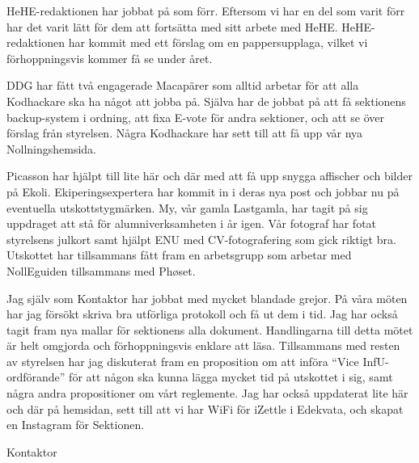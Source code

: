 \documentclass[../_main/handlingar.tex]{subfiles}
\begin{document}

HeHE-redaktionen har jobbat på som förr. Eftersom vi har en del som varit förr har det varit lätt för dem att fortsätta med sitt arbete med HeHE. HeHE-redaktionen har kommit med ett förslag om en pappersupplaga, vilket vi förhoppningsvis kommer få se under året.

DDG har fått två engagerade Macapärer som alltid arbetar för att alla Kodhackare ska ha något att jobba på. Själva har de jobbat på att få sektionens backup-system i ordning, att fixa E-vote för andra sektioner, och att se över förslag från styrelsen. Några Kodhackare har sett till att få upp vår nya Nollningshemsida.

Picasson har hjälpt till lite här och där med att få upp snygga affischer och bilder på Ekoli. Ekiperingsexpertera har kommit in i deras nya post och jobbar nu på eventuella utskottstygmärken. My, vår gamla Lastgamla, har tagit på sig uppdraget att stå för alumniverksamheten i år igen. Vår fotograf har fotat styrelsens julkort samt hjälpt ENU med CV-fotografering som gick riktigt bra. Utskottet har tillsammans fått fram en arbetsgrupp som arbetar med NollEguiden tillsammans med Phøset.

Jag själv som Kontaktor har jobbat med mycket blandade grejor. På våra möten har jag försökt skriva bra utförliga protokoll och få ut dem i tid. Jag har också tagit fram nya mallar för sektionens alla dokument. Handlingarna till detta mötet är helt omgjorda och förhoppningsvis enklare att läsa. Tillsammans med resten av styrelsen har jag diskuterat fram en proposition om att införa ``Vice InfU-ordförande'' för att någon ska kunna lägga mycket tid på utskottet i sig, samt några andra propositioner om vårt reglemente. Jag har också uppdaterat lite här och där på hemsidan, sett till att vi har WiFi för iZettle i Edekvata, och skapat en Instagram för Sektionen.

\begin{signatures}{1}
    \mvh
    \signature{Erik Månsson}{Kontaktor}
\end{signatures}
\end{document}
